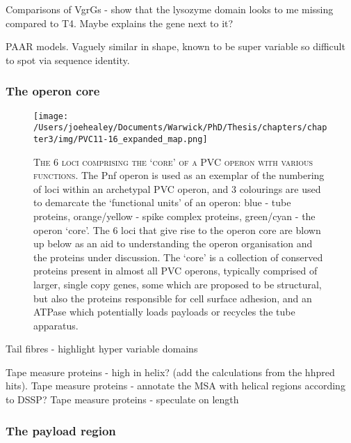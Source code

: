 Comparisons of VgrGs - show that the lysozyme domain looks to me missing compared to T4. Maybe explains the gene next to it?

PAAR models. Vaguely similar in shape, known to be super variable so difficult to spot via sequence identity.

\subsubsection{The operon core}
\begin{figure}[h!]
\texttt{[image: /Users/joehealey/Documents/Warwick/PhD/Thesis/chapters/chapter3/img/PVC11-16\_expanded\_map.png]}
	\captionsetup{singlelinecheck=off, justification=justified, font=footnotesize, aboveskip=10pt}
	\caption[`Core' protein region of a PVC operon]{\textsc{\normalsize The 6 loci comprising the `core' of a PVC operon with various functions.}\vspace{0.1cm} \newline The Pnf operon is used as an exemplar of the numbering of loci within an archetypal PVC operon, and 3 colourings are used to demarcate the `functional units' of an operon: blue - tube proteins, orange/yellow - spike complex proteins, green/cyan - the operon `core'. The 6 loci that give rise to the operon core are blown up below as an aid to understanding the operon organisation and the proteins under discussion. The `core' is a collection of conserved proteins present in almost all PVC operons, typically comprised of larger, single copy genes, some which are proposed to be structural, but also the proteins responsible for cell surface adhesion, and an ATPase which potentially loads payloads or recycles the tube apparatus.}
	\label{PVC11-16map}
\end{figure}
Tail fibres - highlight hyper variable domains

Tape measure proteins - high in helix? (add the calculations from the hhpred hits).
Tape measure proteins - annotate the MSA with helical regions according to DSSP?
Tape measure proteins - speculate on length

\subsubsection{The payload region}











